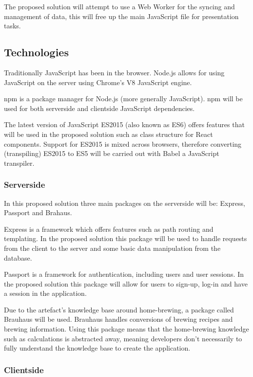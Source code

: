 The proposed solution will attempt to use a Web Worker for the syncing and management of data, this will free up the main JavaScript file for presentation tasks.

\subsection{Technologies} \label{a-d--technologies}

Traditionally JavaScript has been in the browser. Node.js allows for using JavaScript on the server using Chrome's V8 JavaScript engine. \cite{node.js}

npm is a package manager for Node.js (more generally JavaScript). npm will be used for both serverside and clientside JavaScript dependencies.

The latest version of JavaScript ES2015 (also known as ES6) offers features that will be used in the proposed solution such as class structure for React components. Support for ES2015 is mixed across browsers, therefore converting (transpiling) ES2015 to ES5 will be carried out with Babel a JavaScript transpiler. \cite{babel}

\subsubsection{Serverside} \label{a-d--t--serverside}

In this proposed solution three main packages on the serverside will be: Express, Passport and Brahaus. \cite{npm}

Express is a framework which offers features such as path routing and templating. In the proposed solution this package will be used to handle requests from the client to the server and some basic data manipulation from the database. \cite{express}

Passport is a framework for authentication, including users and user sessions. In the proposed solution this package will allow for users to sign-up, log-in and have a session in the application. \cite{passport}

Due to the artefact's knowledge base around home-brewing, a package called Brauhaus will be used. Brauhaus handles conversions of brewing recipes and brewing information. Using this package means that the home-brewing knowledge such as calculations is abstracted away, meaning developers don't necessarily to fully understand the knowledge base to create the application. \cite{brauhaus.js}

\subsubsection{Clientside} \label{a-d--t--clientside}

